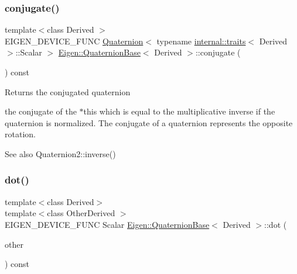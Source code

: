 \subsubsection{\texorpdfstring{conjugate()}{conjugate()}}
{\footnotesize\ttfamily template$<$class Derived $>$ \\
E\+I\+G\+E\+N\+\_\+\+D\+E\+V\+I\+C\+E\+\_\+\+F\+U\+NC \mbox{\hyperlink{class_eigen_1_1_quaternion}{Quaternion}}$<$ typename \mbox{\hyperlink{struct_eigen_1_1internal_1_1traits}{internal\+::traits}}$<$ Derived $>$\+::Scalar $>$ \mbox{\hyperlink{class_eigen_1_1_quaternion_base}{Eigen\+::\+Quaternion\+Base}}$<$ Derived $>$\+::conjugate (\begin{DoxyParamCaption}{ }\end{DoxyParamCaption}) const\hspace{0.3cm}{\ttfamily [inline]}}

\begin{DoxyReturn}{Returns}
the conjugated quaternion

the conjugate of the {\ttfamily $\ast$this} which is equal to the multiplicative inverse if the quaternion is normalized. The conjugate of a quaternion represents the opposite rotation.
\end{DoxyReturn}
\begin{DoxySeeAlso}{See also}
Quaternion2\+::inverse() 
\end{DoxySeeAlso}
\mbox{\label{class_eigen_1_1_quaternion_base_aa95c422b3d12869ed6aa46e4dd5a430a}} 
\subsubsection{\texorpdfstring{dot()}{dot()}}
{\footnotesize\ttfamily template$<$class Derived$>$ \\
template$<$class Other\+Derived $>$ \\
E\+I\+G\+E\+N\+\_\+\+D\+E\+V\+I\+C\+E\+\_\+\+F\+U\+NC Scalar \mbox{\hyperlink{class_eigen_1_1_quaternion_base}{Eigen\+::\+Quaternion\+Base}}$<$ Derived $>$\+::dot (\begin{DoxyParamCaption}\item[{const \mbox{\hyperlink{class_eigen_1_1_quaternion_base}{Quaternion\+Base}}$<$ Other\+Derived $>$ \&}]{other }\end{DoxyParamCaption}) const\hspace{0.3cm}{\ttfamily [inline]}}

